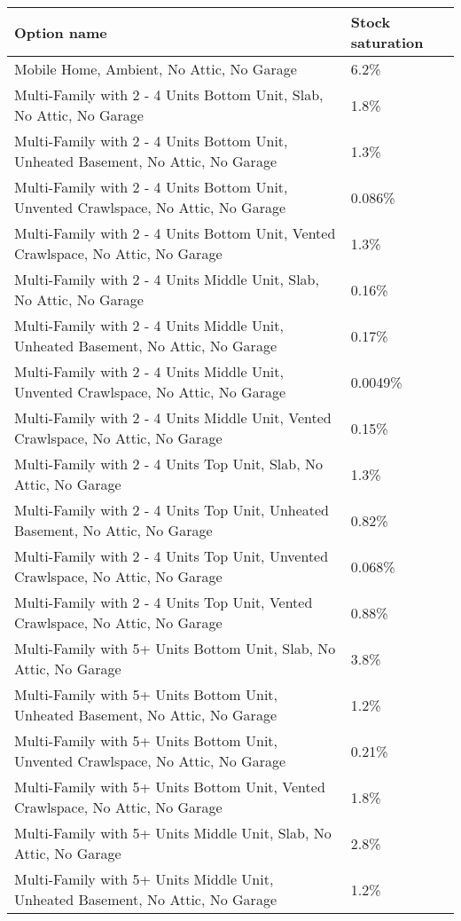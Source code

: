 \begin{longtable}[]{@{}ll@{}}
\toprule\noalign{}
Option name & Stock saturation \\
\midrule\noalign{}
\endhead
\bottomrule\noalign{}
\endlastfoot
Mobile Home, Ambient, No Attic, No Garage & 6.2\% \\
Multi-Family with 2 - 4 Units Bottom Unit, Slab, No Attic, No Garage &
1.8\% \\
Multi-Family with 2 - 4 Units Bottom Unit, Unheated Basement, No Attic,
No Garage & 1.3\% \\
Multi-Family with 2 - 4 Units Bottom Unit, Unvented Crawlspace, No
Attic, No Garage & 0.086\% \\
Multi-Family with 2 - 4 Units Bottom Unit, Vented Crawlspace, No Attic,
No Garage & 1.3\% \\
Multi-Family with 2 - 4 Units Middle Unit, Slab, No Attic, No Garage &
0.16\% \\
Multi-Family with 2 - 4 Units Middle Unit, Unheated Basement, No Attic,
No Garage & 0.17\% \\
Multi-Family with 2 - 4 Units Middle Unit, Unvented Crawlspace, No
Attic, No Garage & 0.0049\% \\
Multi-Family with 2 - 4 Units Middle Unit, Vented Crawlspace, No Attic,
No Garage & 0.15\% \\
Multi-Family with 2 - 4 Units Top Unit, Slab, No Attic, No Garage &
1.3\% \\
Multi-Family with 2 - 4 Units Top Unit, Unheated Basement, No Attic, No
Garage & 0.82\% \\
Multi-Family with 2 - 4 Units Top Unit, Unvented Crawlspace, No Attic,
No Garage & 0.068\% \\
Multi-Family with 2 - 4 Units Top Unit, Vented Crawlspace, No Attic, No
Garage & 0.88\% \\
Multi-Family with 5+ Units Bottom Unit, Slab, No Attic, No Garage &
3.8\% \\
Multi-Family with 5+ Units Bottom Unit, Unheated Basement, No Attic, No
Garage & 1.2\% \\
Multi-Family with 5+ Units Bottom Unit, Unvented Crawlspace, No Attic,
No Garage & 0.21\% \\
Multi-Family with 5+ Units Bottom Unit, Vented Crawlspace, No Attic, No
Garage & 1.8\% \\
Multi-Family with 5+ Units Middle Unit, Slab, No Attic, No Garage &
2.8\% \\
Multi-Family with 5+ Units Middle Unit, Unheated Basement, No Attic, No
Garage & 1.2\% \\

\end{longtable}
